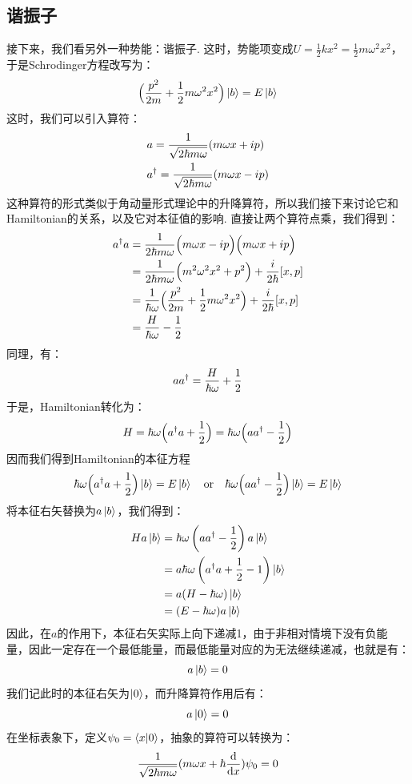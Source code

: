 \subsection{谐振子}
接下来，我们看另外一种势能：谐振子. 这时，势能项变成\(U = \frac{1}{2}kx^2=\frac{1}{2}m\omega^2x^2\)，于是Schrodinger方程改写为：
\[
\Big(\frac{{p}^2}{2m} + \frac{1}{2}m\omega^{2}{x}^{2}\Big)\ket{b} = E\ket{b} 
\]
这时，我们可以引入算符：
\begin{align*}
& {a} = \frac{1}{\sqrt{2\hbar m\omega}}(m\omega{x} + i{p}) \\
& {a}^{\dagger} = \frac{1}{\sqrt{2\hbar m\omega}}(m\omega{x} - i{p})
\end{align*}
这种算符的形式类似于角动量形式理论中的升降算符，所以我们接下来讨论它和Hamiltonian的关系，以及它对本征值的影响. 直接让两个算符点乘，我们得到：
\begin{align*}
{a}^{\dagger}{a} 
& = \frac{1}{2\hbar m\omega}\Big(m\omega{x} - i{p}\Big)\Big(m\omega{x} + i{p}\Big) \\
& = \frac{1}{2\hbar m\omega}\Big(m^{2}\omega^2{x}^{2} + {p}^{2}\Big) + \frac{i}{2\hbar}[{x},{p}] \\
& = \frac{1}{\hbar\omega}\Big(\frac{{p}^{2}}{2m} + \frac{1}{2}m\omega^2{x}^{2}\Big) + \frac{i}{2\hbar}[{x},{p}] \\
& = \frac{{H}}{\hbar\omega} - \frac{1}{2}
\end{align*}
同理，有：
\[
{a}{a}^{\dagger} = \frac{{H}}{\hbar\omega} + \frac{1}{2}
\]
于是，Hamiltonian转化为：
\[
{H} = \hbar\omega\Big({a}^{\dagger}{a} + \frac{1}{2}\Big) = \hbar\omega\Big({a}{a}^{\dagger} - \frac{1}{2}\Big)
\]
因而我们得到Hamiltonian的本征方程
\[
\hbar\omega\Big({a}^{\dagger}{a} + \frac{1}{2}\Big)\ket{b} = E\ket{b}\quad \mathrm{or}\quad \hbar\omega\Big({a}{a}^{\dagger} - \frac{1}{2}\Big)\ket{b} = E\ket{b}
\]
将本征右矢替换为\(a\ket{b}\)，我们得到：
\begin{align*}
H{a}\ket{b}
& = \hbar\omega\left({aa^{\dagger} -\frac{1}{2}}\right)a\ket{b} \\
& = a\hbar\omega\left({a^{\dagger}a + \frac{1}{2} - 1}\right)\ket{b} \\
& = a(H-\hbar\omega)\ket{b} \\
& = (E-\hbar\omega)a\ket{b}
\end{align*}
因此，在\(a\)的作用下，本征右矢实际上向下递减1，由于非相对情境下没有负能量，因此一定存在一个最低能量，而最低能量对应的为无法继续递减，也就是有：
\[
a\ket{b} = 0
\]
我们记此时的本征右矢为\(\ket{0}\)，而升降算符作用后有：
\[
a\ket{0} = 0 
\]
在坐标表象下，定义\(\psi_{0} = \bra{x}\ket{0}\)，抽象的算符可以转换为：
\[
\frac{1}{\sqrt{2\hbar m\omega}}(m\omega{x} + \hbar\frac{\dd{}}{\dd{x}})\psi_{0} =0 
\]
